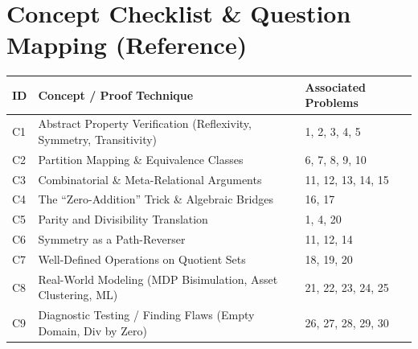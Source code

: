 \documentclass[11pt, a4paper]{article}
\theoremstyle{definition}
\theoremstyle{remark}
\begin{document}
\newpage

\section{Concept Checklist \& Question Mapping (Reference)}

\vspace{1em}
\renewcommand{\arraystretch}{1.5}
\noindent
\begin{tabularx}{\textwidth}{l X l}
\toprule
\textbf{ID} & \textbf{Concept / Proof Technique} & \textbf{Associated Problems} \\
\midrule
C1 & Abstract Property Verification (Reflexivity, Symmetry, Transitivity) & 1, 2, 3, 4, 5 \\
C2 & Partition Mapping \& Equivalence Classes & 6, 7, 8, 9, 10 \\
C3 & Combinatorial \& Meta-Relational Arguments & 11, 12, 13, 14, 15 \\
C4 & The ``Zero-Addition'' Trick \& Algebraic Bridges & 16, 17 \\
C5 & Parity and Divisibility Translation & 1, 4, 20 \\
C6 & Symmetry as a Path-Reverser & 11, 12, 14 \\
C7 & Well-Defined Operations on Quotient Sets & 18, 19, 20 \\
C8 & Real-World Modeling (MDP Bisimulation, Asset Clustering, ML) & 21, 22, 23, 24, 25 \\
C9 & Diagnostic Testing / Finding Flaws (Empty Domain, Div by Zero) & 26, 27, 28, 29, 30 \\
\bottomrule
\end{tabularx}
\vspace{1em}
\end{document}
